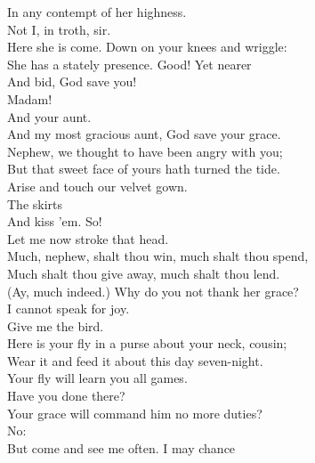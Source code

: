 \documentclass[a4paper,oneside,12pt]{memoir}
\begin{document}
\begin{drama*}
In any contempt of her highness.\\
\dapperspeaks {} Not I, in troth, sir.\\
\subtlespeaks Here she is come. Down on your knees and wriggle:\\
She has a stately presence. Good! Yet nearer\\
And bid, God save you!\\
\dapperspeaks {} Madam!\\
\subtlespeaks {} And your aunt.\\
\dapperspeaks And my most gracious aunt, God save your grace.\\
\dolspeaks Nephew, we thought to have been angry with you;\\
But that sweet face of yours hath turned the tide.\\
Arise and touch our velvet gown.\\
\subtlespeaks {} The skirts\\
And kiss 'em. So!\\
\dolspeaks {} Let me now stroke that head.\\
Much, nephew, shalt thou win, much shalt thou spend,\\
Much shalt thou give away, much shalt thou lend.\\
\subtlespeaks (Ay, much indeed.) Why do you not thank her grace?\\
\dapperspeaks I cannot speak for joy.\\
\dolspeaks {} Give me the bird.\\
Here is your fly in a purse about your neck, cousin;\\
Wear it and feed it about this day seven-night.\\
\subtlespeaks Your fly will learn you all games.\\
\facespeaks {}  Have you done there?\\
\subtlespeaks Your grace will command him no more duties?\\
\dolspeaks {} No:\\
But come and see me often. I may chance\\

\end{drama*}
\end{document}
